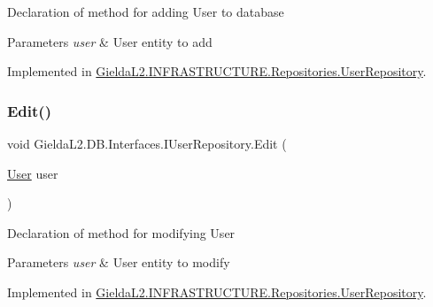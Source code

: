 Declaration of method for adding User to database 


\begin{DoxyParams}{Parameters}
{\em user} & User entity to add\\
\hline
\end{DoxyParams}


Implemented in \mbox{\hyperlink{class_gielda_l2_1_1_i_n_f_r_a_s_t_r_u_c_t_u_r_e_1_1_repositories_1_1_user_repository_a686490e4e59fb25b843d11bab137ec56}{Gielda\+L2.\+I\+N\+F\+R\+A\+S\+T\+R\+U\+C\+T\+U\+R\+E.\+Repositories.\+User\+Repository}}.

\mbox{\label{interface_gielda_l2_1_1_d_b_1_1_interfaces_1_1_i_user_repository_a65d2dc63fea742354209b2e13a15a452}} 
\subsubsection{\texorpdfstring{Edit()}{Edit()}}
{\footnotesize\ttfamily void Gielda\+L2.\+D\+B.\+Interfaces.\+I\+User\+Repository.\+Edit (\begin{DoxyParamCaption}\item[{\mbox{\hyperlink{class_gielda_l2_1_1_d_b_1_1_entities_1_1_user}{User}}}]{user }\end{DoxyParamCaption})}



Declaration of method for modifying User 


\begin{DoxyParams}{Parameters}
{\em user} & User entity to modify\\
\hline
\end{DoxyParams}


Implemented in \mbox{\hyperlink{class_gielda_l2_1_1_i_n_f_r_a_s_t_r_u_c_t_u_r_e_1_1_repositories_1_1_user_repository_a2e07a0a1dd9a6731ed8706b82c66fb49}{Gielda\+L2.\+I\+N\+F\+R\+A\+S\+T\+R\+U\+C\+T\+U\+R\+E.\+Repositories.\+User\+Repository}}.

\mbox{\label{interface_gielda_l2_1_1_d_b_1_1_interfaces_1_1_i_user_repository_ada0fb28a6665ffc0191086563dbeb28e}} 
